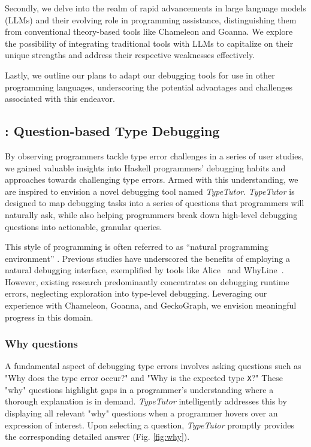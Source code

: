 Secondly, we delve into the realm of rapid advancements in large language models (LLMs) and their evolving role in programming assistance, distinguishing them from conventional theory-based tools like Chameleon and Goanna. We explore the possibility of integrating traditional tools with LLMs to capitalize on their unique strengths and address their respective weaknesses effectively.

Lastly, we outline our plans to adapt our debugging tools for use in other programming languages, underscoring the potential advantages and challenges associated with this endeavor.

\subsection{\typetutor: Question-based Type Debugging}
By observing programmers tackle type error challenges in a series of user studies, we gained valuable insights into Haskell programmers' debugging habits and approaches towards challenging type errors. Armed with this understanding, we are inspired to envision a novel debugging tool named \textit{TypeTutor}. \textit{TypeTutor} is designed to map debugging tasks into a series of questions that programmers will naturally ask, while also helping programmers break down high-level debugging questions into actionable, granular queries.

This style of programming is often referred to as ``natural programming environment'' \cite{Myers2004-fy}. Previous studies have underscored the benefits of employing a natural debugging interface, exemplified by tools like Alice~\cite{Conway2000-nn} and WhyLine~\cite{Ko2009-uf}. However, existing research predominantly concentrates on debugging runtime errors, neglecting exploration into type-level debugging.  Leveraging our experience with Chameleon, Goanna, and GeckoGraph, we envision meaningful progress in this domain.


\subsubsection{Why questions}

A fundamental aspect of debugging type errors involves asking questions such as "Why does the type error occur?" and "Why is the expected type \texttt{X}?" These "why" questions highlight gaps in a programmer's understanding where a thorough explanation is in demand. \textit{TypeTutor} intelligently addresses this by displaying all relevant "why" questions when a programmer hovers over an expression of interest. Upon selecting a question, \textit{TypeTutor} promptly provides the corresponding detailed answer (Fig. \ref{fig:why}).



